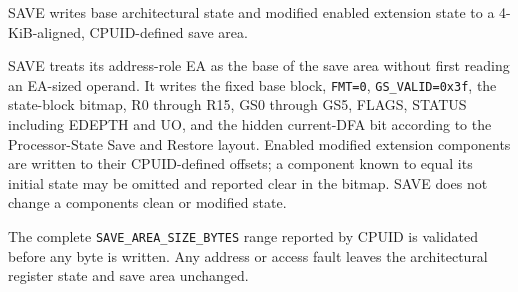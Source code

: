 SAVE writes base architectural state and modified enabled extension state to a 4-KiB-aligned, CPUID-defined save area.

SAVE treats its address-role EA as the base of the save area without first reading an EA-sized operand. It writes the fixed base block, \texttt{FMT=0}, \texttt{GS\_VALID=0x3f}, the state-block bitmap, R0 through R15, GS0 through GS5, FLAGS, STATUS including EDEPTH and UO, and the hidden current-DFA bit according to the Processor-State Save and Restore layout. Enabled modified extension components are written to their CPUID-defined offsets; a component known to equal its initial state may be omitted and reported clear in the bitmap. SAVE does not change a component\textquotesingle{}s clean or modified state.

The complete \texttt{SAVE\_AREA\_SIZE\_BYTES} range reported by CPUID is validated before any byte is written. Any address or access fault leaves the architectural register state and save area unchanged.
